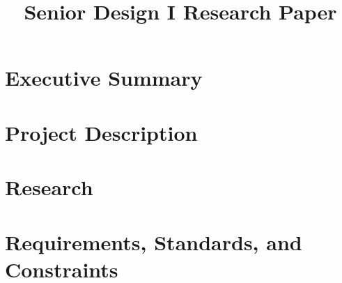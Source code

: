 \documentclass[12pt, letterpaper]{article}
\title{Senior Design I Research Paper}
\begin{document}
	\sloppy %
	
	\begin{singlespace}
	

	\tableofcontents
	\newpage
	\listoffigures
	\newpage
	\listoftables
	\setcounter{secnumdepth}{3}

	\newpage
	\section{Executive Summary}
	
	
	\newpage
	\section{Project Description}
	
	
	
	
	
	
	
	\newpage
	\section{Research}
	
	
	
	
	
	
	\newpage
	\section{Requirements, Standards, and Constraints}
	
	
	
	
	
	

	\newpage

\end{singlespace}
\end{document}
